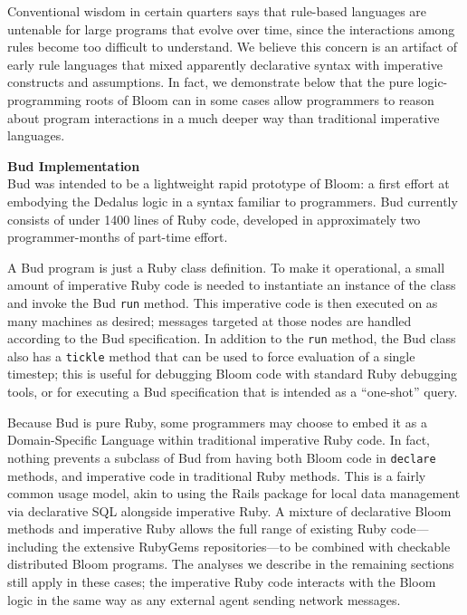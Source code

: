 Conventional wisdom in certain quarters says that rule-based languages are untenable for large programs that evolve over time, since the interactions among rules become too difficult to understand.  We believe this concern is an artifact of early rule languages that mixed apparently declarative syntax with imperative constructs and assumptions.  In fact, we demonstrate below that the pure logic-programming roots of Bloom can in some cases allow programmers to reason about program interactions in a much deeper way than traditional imperative languages.

\textbf{Bud Implementation}\\
Bud was intended to be a lightweight rapid prototype of Bloom: a first effort at embodying the Dedalus logic in a syntax familiar to programmers.  Bud currently consists of under 1400 lines of Ruby code, developed in approximately two programmer-months of part-time effort.

A Bud program is just a Ruby class definition.  To make it operational, a small amount of imperative Ruby code is needed to instantiate an instance of the class and invoke the Bud \texttt{run} method.  This imperative code is then executed on as many machines as desired; messages targeted at those nodes are handled according to the Bud specification.  In addition to the \texttt{run} method, the Bud class also has a \texttt{tickle} method that can be used to force evaluation of a single timestep; this is useful for debugging Bloom code with standard Ruby debugging tools, or for executing a Bud specification that is intended as a ``one-shot'' query.

Because Bud is pure Ruby, some programmers may choose to embed it as a Domain-Specific Language within traditional imperative Ruby code.  In fact, nothing prevents a subclass of Bud from having both Bloom code in \texttt{declare} methods, and imperative code in traditional Ruby methods.  This is a fairly common usage model, akin to using the Rails package for local data management via declarative SQL alongside imperative Ruby. A mixture of declarative Bloom methods and imperative Ruby allows the full range of existing Ruby code---including the extensive RubyGems repositories---to be combined with checkable distributed Bloom programs. The analyses we describe in the remaining sections still apply in these cases; the imperative Ruby code interacts with the Bloom logic in the same way as any external agent sending network messages.